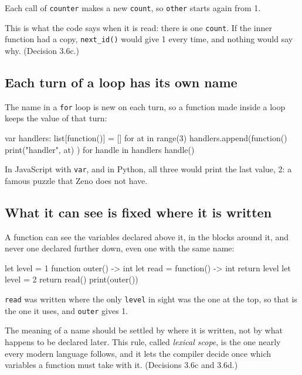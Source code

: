 Each call of \verb|counter| makes a new \verb|count|, so \verb|other|
starts again from 1.

\begin{why}
This is what the code says when it is read: there is one
\verb|count|. If the inner function had a copy, \verb|next_id()|
would give 1 every time, and nothing would say why. (Decision 3.6c.)
\end{why}

\subsection{Each turn of a loop has its own name}

The name in a \verb|for| loop is new on each turn, so a function made
inside a loop keeps the value of that turn:

\begin{zeno}
var handlers: list[function()] = []
for at in range(3) {
    handlers.append(function() { print("handler", at) })
}
for handle in handlers {
    handle()
}
\end{zeno}

In JavaScript with \verb|var|, and in Python, all three would print the
last value, 2: a famous puzzle that Zeno does not have.

\subsection{What it can see is fixed where it is written}

A function can see the variables declared above it, in the blocks
around it, and never one declared further down, even one with the
same name:

\begin{zeno}
let level = 1
function outer() -> int {
    let read = function() -> int { return level }
    let level = 2
    return read()
}
print(outer())
\end{zeno}

\verb|read| was written where the only \verb|level| in sight was the
one at the top, so that is the one it uses, and \verb|outer| gives 1.

\begin{why}
The meaning of a name should be settled by where it is written, not
by what happens to be declared later. This rule, called
\emph{lexical scope}, is the one nearly every modern language follows,
and it lets the compiler decide once which variables a function must
take with it. (Decisions 3.6c and 3.6d.)
\end{why}

